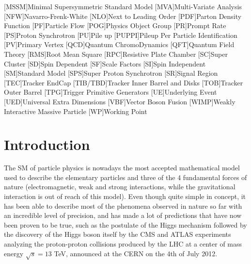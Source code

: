 \documentclass[a4paper, 10pt, openright]{report}
\begin{document}
\begin{multicols}{2}
\begin{acronym}
[MSSM]{Minimal Supersymmetric Standard Model}
[MVA]{Multi-Variate Analysis}
[NFW]{Navarro-Frenk-White}
[NLO]{Next to Leading Order}
[PDF]{Parton Density Function}
[PF]{Particle Flow}
[POG]{Physics Object Group}
[PR]{Prompt Rate}
[PS]{Proton Synchrotron}
[PU]{Pile up}
[PUPPI]{Pileup Per Particle Identification}
[PV]{Primary Vertex}
[QCD]{Quantum ChromoDynamics}
[QFT]{Quantum Field Theory}
[RMS]{Root Mean Square}
[RPC]{Resistive Plate Chamber}
[SC]{Super Cluster}
[SD]{Spin Dependent}
[SF]{Scale Factors}
[SI]{Spin Independent}
[SM]{Standard Model}
[SPS]{Super Proton Synchrotron}
[SR]{Signal Region}
[TEC]{Tracker EndCap} 
[TIB/TBD]{Tracker Inner Barrel and Disks}
[TOB]{Tracker Outer Barrel}
[TPG]{Trigger Primitive Generators}
[UE]{Underlying Event}
[UED]{Universal Extra Dimensions}
[VBF]{Vector Boson Fusion}
[WIMP]{Weakly Interactive Massive Particle}
[WP]{Working Point}

\end{acronym}
\end{multicols}
\newpage

\tableofcontents

\thispagestyle{empty}
\newpage


\clearpage
\thispagestyle{empty}
\phantom{a}
\vfill
\newpage

\setlength{\parskip}{8pt}

\chapter{Introduction}

The \acf{SM} of particle physics \cite{SM} is nowadays the most accepted mathematical model used to describe the elementary particles and three of the 4 fundamental forces of nature (electromagnetic, weak and strong interactions, while the gravitational interaction is out of reach of this model). Even though quite simple in concept, it has been able to describe most of the phenomena observed in nature so far with an incredible level of precision, and has made a lot of predictions that have now been proven to be true, such as the postulate of the Higgs mechanism \cite{HiggsPostulate1, HiggsPostulate2} followed by the discovery of the Higgs boson itself \cite{HiggsDiscovery1, HiggsDiscovery2} by the \ac{CMS} \cite{CMS} and \ac{ATLAS} \cite{ATLAS} experiments analyzing the proton-proton collisions produced by the \acf{LHC} at a center of mass energy $\sqrt{s} = 13$ TeV, announced at the \ac{CERN} on the 4th of July 2012. 
\end{document}
